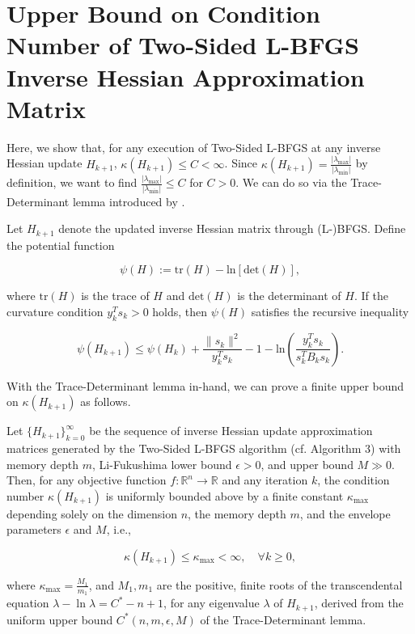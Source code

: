 \documentclass[twoside,11pt]{article}
\begin{document}
\section{Upper Bound on Condition Number of Two-Sided L-BFGS Inverse Hessian Approximation Matrix}

Here, we show that, for any execution of Two-Sided L-BFGS at any inverse Hessian update $H_{k+1}$, $\kappa(H_{k+1}) \leq C < \infty$. Since $\kappa(H_{k+1}) = \frac{|\lambda_{\text{max}}|}{|\lambda_{\text{min}}|}$ by definition, we want to find $\frac{|\lambda_{\text{max}}|}{|\lambda_{\text{min}}|} \leq C$ for $C > 0$. We can do so via the Trace-Determinant lemma introduced by \cite{BN89}.

\begin{lemma}
Let $H_{k+1}$ denote the updated inverse Hessian matrix through (L-)BFGS. Define the potential function

\[
\psi(H) := \text{tr}(H) - \text{ln}[\text{det}(H)],
\]

\noindent
where $\text{tr}(H)$ is the trace of $H$ and $\text{det}(H)$ is the determinant of $H$. If the curvature condition $y_k^T s_k > 0$ holds, then $\psi(H)$ satisfies the recursive inequality

\[
\psi(H_{k+1}) \leq \psi(H_k) + \frac{\|s_k \|^2}{y_k^T s_k} - 1 - \text{ln}(\frac{y_k^T s_k}{s_k^T B_k s_k}).
\]
\end{lemma}

\noindent
With the Trace-Determinant lemma in-hand, we can prove a finite upper bound on $\kappa(H_{k+1})$ as follows.

\begin{theorem}
Let \(\{H_{k+1}\}_{k=0}^{\infty}\) be the sequence of inverse Hessian update approximation matrices generated by the Two-Sided L-BFGS algorithm (cf. Algorithm 3) with memory depth $m$, Li-Fukushima lower bound $\epsilon > 0$, and upper bound $M \gg 0$. Then, for any objective function \(f: \mathbb{R}^n \to \mathbb{R}\) and any iteration $k$, the condition number \(\kappa(H_{k+1})\) is uniformly bounded above by a finite constant \(\kappa _{\max }\) depending solely on the dimension \(n\), the memory depth \(m\), and the envelope parameters \(\epsilon \) and \(M\), i.e., 

\begin{equation} \kappa(H_{k+1}) \leq \kappa_{\max} < \infty, \quad \forall k \geq 0, 
\end{equation}

\noindent
where \(\kappa_{\max} = \frac{M_1}{m_1}\), and \(M_1, m_1\) are the positive, finite roots of the transcendental equation \(\lambda - \ln \lambda = C^*-n+1\), for any eigenvalue $\lambda$ of $H_{k+1}$, derived from the uniform upper bound \(C^*(n, m, \epsilon, M)\) of the Trace-Determinant lemma.
\end{theorem}
\end{document}
